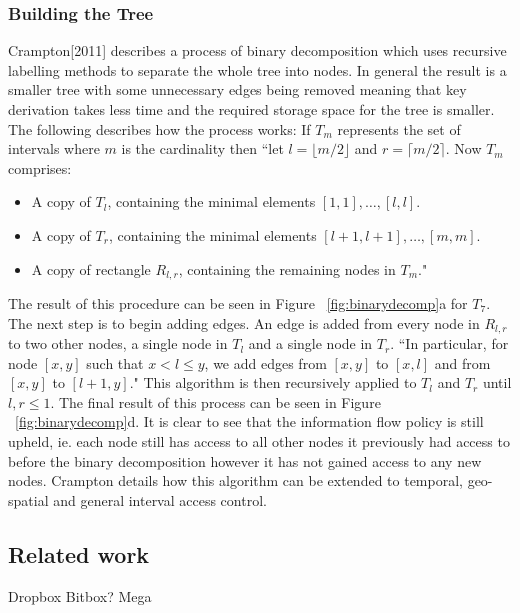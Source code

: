 \documentclass[12pt, titlepage]{article}
\begin{document}
\subsubsection{Building the Tree}
Crampton[2011]\cite{mainPaper} describes a process of binary decomposition which uses recursive labelling methods to separate the whole tree into nodes. In general the result is a smaller tree with some unnecessary edges being removed meaning that key derivation takes less time and the required storage space for the tree is smaller. The following describes how the process works:
\newline \indent If $T_{m}$ represents the set of intervals where $m$ is the cardinality then ``let $l = \lfloor m/2 \rfloor$ and $r = \lceil m/2 \rceil$. Now $T_{m}$ comprises:
\begin{itemize}
\item A copy of $T_{l}$, containing the minimal elements $[1, 1], \dots , [l,l]$.
\item A copy of $T_{r}$, containing the minimal elements $[l + 1, l + 1], \dots , [m, m]$.
\item A copy of rectangle $R_{l,r}$, containing the remaining nodes in $T_{m}$."
\end{itemize}
The result of this procedure can be seen in Figure ~\ref{fig:binarydecomp}a for $T_{7}$.
\newline The next step is to begin adding edges. An edge is added from every node in $R_{l,r}$ to two other nodes, a single node in $T_{l}$ and a single node in $T_{r}$. ``In particular, for node $[x, y]$ such that $x<l≤y$, we add edges from $[x, y]$ to $[x, l]$ and from $[x, y]$ to $[l + 1, y]$."
\newline This algorithm is then recursively applied to $T_{l}$ and $T_{r}$ until $l, r ≤ 1$. The final result of this process can be seen in Figure ~\ref{fig:binarydecomp}d.
\newline \indent It is clear to see that the information flow policy is still upheld, ie. each node still has access to all other nodes it previously had access to before the binary decomposition however it has not gained access to any new nodes.
\newline \indent Crampton details how this algorithm can be extended to temporal, geo-spatial and general interval access control.

\subsection{Related work}
Dropbox
Bitbox?
Mega
\end{document}
